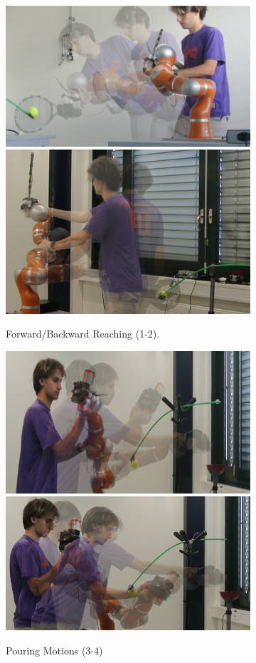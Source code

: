\documentclass[letterpaper, 10 pt, journal, twoside, fleqn]{IEEEtran}
\begin{document}
\begin{figure}[!ht]
  \begin{minipage}[b]{0.31\textwidth}
	\centering	
		\begin{subfigure}[t]{\linewidth}
		\centering
			\includegraphics[width=0.5\linewidth]{./figures/forehand_crop.png}\hspace{5pt}\includegraphics[width=0.43\linewidth]{./figures/backhand_crop.png}
					\caption{Forward/Backward Reaching (1-2).\label{fig:forback}}
		\end{subfigure}
		\begin{subfigure}[t]{\linewidth}
\centering
	\includegraphics[width=0.45\linewidth]{./figures/pour-free_crop.png}\hspace{5pt}\includegraphics[width=0.477\linewidth]{./figures/pour-obst_crop.png}
						\caption{ Pouring Motions (3-4)}
			\end{subfigure}
			\begin{subfigure}[t]{\linewidth}		
\centering

\end{subfigure}
\end{minipage}
\end{figure}
\end{document}
